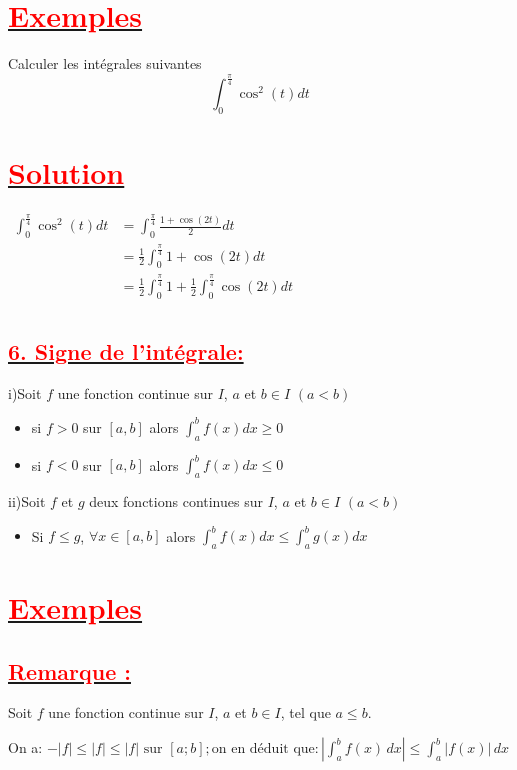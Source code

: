 \documentclass[12pt,a4paper]{article}
\begin{document}
\section*{\underline{\textbf{\textcolor{red}{Exemples}}}}
Calculer les intégrales suivantes
\[ \int_0^{\frac{\pi}{4}}\cos^{2}(t)dt\]
\section*{\underline{\textbf{\textcolor{red}{Solution}}}}
\( 
\begin{aligned} 
\int_0^{\frac{\pi}{4}}\cos^{2}(t)dt &=\int_0^{\frac{\pi}{4}}\frac{1+\cos(2t)}{2}dt \\
&=\frac{1}{2}\int_0^{\frac{\pi}{4}}1+\cos(2t)dt \\
&=\frac{1}{2}\int_0^{\frac{\pi}{4}}1+\frac{1}{2}\int_0^{\frac{\pi}{4}}\cos(2t)dt \\
\end{aligned}
\)
\subsection*{\underline{\textbf{\textcolor{red}{6. Signe de l'intégrale:}}}}
i)Soit $f$ une fonction continue sur $I$, $a$ et $b\in I$  $(a<b)$
\begin{itemize}
\item si $f>0$ sur $[a,b]$ alors $\int_a^b f(x)dx \geq 0$
\item si $f<0$ sur $[a,b]$ alors $\int_a^b f(x)dx \leq 0$
\end{itemize}
ii)Soit $f$ et $g$ deux fonctions continues sur $I$, $a$ et $b\in I$  $(a<b)$
\begin{itemize}
\item Si $f \leq g$, $\forall x \in[a,b]$ alors $ \int_a^b f(x)dx \leq \int_a^b g(x)dx$
\end{itemize}
\section*{\underline{\textbf{\textcolor{red}{Exemples}}}}

\subsection*{\underline{\textbf{\textcolor{red}{Remarque :}}}}

Soit \( f \) une fonction continue sur \( I \), \( a \) et \( b \in I \), tel que \( a \leq b \).

On a: \( -|f| \leq |f| \leq |f| \text{ sur } [a ; b] ; \text{on en déduit que} : \left| \int_a^b f(x) \, dx \right| \leq \int_a^b |f(x)| \, dx\)
\end{document}
